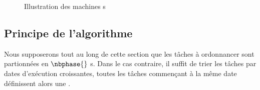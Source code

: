 \documentclass[a4paper,9pt]{article}
\begin{document}
\begin{figure}
    \centering
    \begin{ordo}[10]{4}{1}{12}





    \end{ordo}
    \caption{Illustration des machines s}
    \label{fig:kdisp}
\end{figure}

\subsection{Principe de l'algorithme}
\label{subsec:pres_algo}

%
%
Nous supposerons tout au long de cette section que les tâches à ordonnancer sont partionnées en
$\nbphase{}$ \tphase{}s. Dans le cas contraire, il suffit de trier les tâches par dates d'exécution
croissantes, toutes les tâches commençant à la même date définissent alors une \tphase{}.
\end{document}
